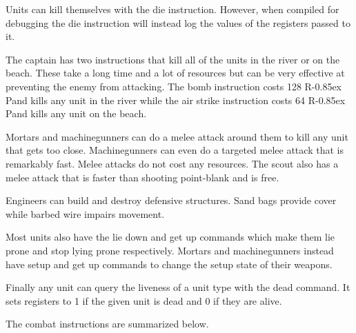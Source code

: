 \documentclass{article}
\newcommand{\RP}{R\kern-0.85ex P}
\begin{document}
Units can kill themselves with the die instruction. However, when compiled for
debugging the die instruction will instead log the values of the registers
passed to it.

The captain has two instructions that kill all of the units in the river or on
the beach. These take a long time and a lot of resources but can be very
effective at preventing the enemy from attacking. The bomb instruction costs 128
\RP and kills any unit in the river while the air strike instruction costs 64
\RP and kills any unit on the beach.

Mortars and machinegunners can do a melee attack around them to kill any unit
that gets too close. Machinegunners can even do a targeted melee attack that
is remarkably fast. Melee attacks do not cost any resources. The scout also has
a melee attack that is faster than shooting point-blank and is free.

Engineers can build and destroy defensive structures. Sand bags provide cover
while barbed wire impairs movement.

Most units also have the lie down and get up commands which make them lie prone
and stop lying prone respectively. Mortars and machinegunners instead have setup
and get up commands to change the setup state of their weapons.

Finally any unit can query the liveness of a unit type with the dead command. It
sets registers to 1 if the given unit is dead and 0 if they are alive.

The combat instructions are summarized below.
\end{document}

